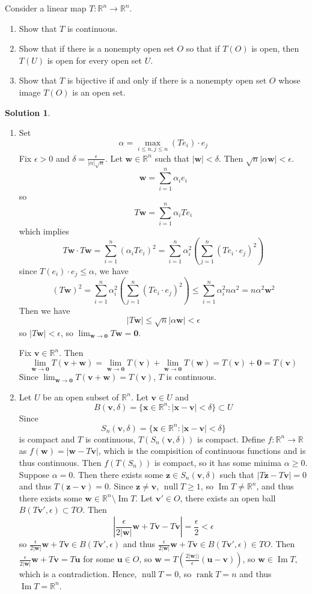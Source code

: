 \documentclass[11pt]{article}
\theoremstyle{definition}
\newenvironment{customex}[1]
  {\renewcommand\theinnercustomex{#1}\innercustomex}
  {\endinnercustomex}
\newtheorem*{solution}{Solution}
\newcommand{\R}{\mathbb{R}}
\DeclareMathOperator{\nul}{null}
\DeclareMathOperator{\rank}{rank}
\DeclareMathOperator{\im}{Im}
\newcommand{\e}{\epsilon}
\newcommand{\de}{\delta}
\newcommand{\vv}{\mathbf{v}}
\newcommand{\vu}{\mathbf{u}}
\newcommand{\vw}{\mathbf{w}}
\newcommand{\vx}{\mathbf{x}}
\newcommand{\vz}{\mathbf{z}}
\newcommand{\vzero}{\mathbf{0}}
\begin{document}
    \begin{customex}{\textbf{0}}
        Consider a linear map $T:\R^n \to \R^n$.
        \begin{enumerate}[label=\alph*)]
            \item Show that $T$ is continuous.
            \item  Show that if there is a nonempty open set $O$ so that if $T(O)$ is open, then $T(U)$ is open for every open
            set $U$.
            \item Show that $T$ is bijective if and only if there is a nonempty open set $O$ whose image $T(O)$ is an open set.
        \end{enumerate}
    \end{customex}

    \begin{solution}
        \begin{enumerate}[label=\alph*)]
            \item Set $$\alpha = \max_{i \le n, j \le n} (Te_i) \cdot e_j$$Fix $\e > 0$ and $\de = \frac{\e}{|\alpha|\sqrt{n}}$. Let $\vw \in \R^n$ such that $|\vw| < \de$. Then $\sqrt{n}|\alpha\vw| < \e$.$$\vw = \sum_{i = 1}^n \alpha_i e_i$$so$$T\vw =  \sum_{i = 1}^n \alpha_i Te_i$$which implies$$T\vw \cdot T\vw = \sum_{i = 1}^n (\alpha_i Te_i)^2 = \sum_{i = 1}^n \alpha_i^2 \left(\sum_{j = 1}^n (Te_i\cdot e_j)^2\right)$$since $T(e_i)\cdot e_j \le \alpha$, we have $$(T\vw)^2 = \sum_{i = 1}^n \alpha_i^2 \left(\sum_{j = 1}^n (Te_i\cdot e_j)^2\right) \le \sum_{i = 1}^n \alpha_i^2 n \alpha^2 = n\alpha^2\vw^2$$Then we have $$|T\vw| \le \sqrt{n}|\alpha\vw| < \e$$so $|T\vw| < \e$, so $\lim_{\vw \to \vzero} T\vw = \vzero$.
            
            Fix $\vv \in \R^n$. Then $$\lim_{\vw \to \vzero} T(\vv + \vw) = \lim_{\vw \to \vzero} T(\vv) + \lim_{\vw \to \vzero} T(\vw) = T(\vv) + \vzero = T(\vv)$$Since $\lim_{\vw \to \vzero} T(\vv + \vw) = T(\vv)$, $T$ is continuous.


            \item Let $U$ be an open subset of $\R^n$. Let $\vv \in U$ and $$B(\vv, \de) = \{\vx \in \R^n : |\vx - \vv| < \de\} \subset U$$Since $$S_n(\vv, \de) = \{\vx \in \R^n : |\vx - \vv| < \de\}$$ is compact and $T$ is continuous, $T(S_n(\vv, \de))$ is compact. Define $f: \R^n \to \R$ as $f(\vw) = |\vw - T\vv|$, which is the compisition of continuous functions and is thus continuous. Then $f(T(S_n))$ is compact, so it has some minima $\alpha \ge 0$. Suppose $\alpha = 0$. Then there exists some $\vz \in S_n(\vv, \de)$ such that $|T\vz - T\vv| = 0$ and thus $T(\vz - \vv) = 0$. Since $\vz \neq \vv$, $\nul T \ge 1$, so $\im T \neq \R^n$, and thus there exists some $\vw \in \R^n \setminus \im T$. Let $\vv' \in O$, there exists an open ball $B(T\vv', \e) \subset TO$. Then $$\left|\frac{\e}{2|\vw|}\vw + T\vv - T\vv\right| = \frac{\e}{2} < \e$$so $\frac{\e}{2|\vw|}\vw + T\vv \in B(T\vv', \e)$ and thus $\frac{\e}{2|\vw|}\vw + T\vv \in B(T\vv', \e) \in TO$. Then $\frac{\e}{2|\vw|}\vw + T\vv = T\vu$ for some $\vu \in O$, so $\vw = T(\frac{2|\vw|)}{\e}(\vu - \vv))$, so $\vw \in \im T$, which is a contradiction. Hence, $\nul T = 0$, so $\rank T = n$ and thus $\im T = \R^n$.
            

\end{enumerate}
\end{solution}
\end{document}
